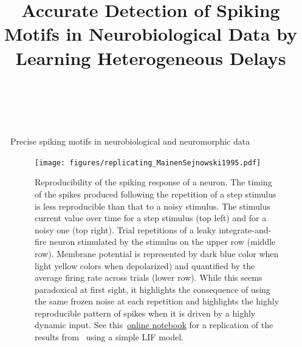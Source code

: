 \documentclass[final]{beamer}
\title{Accurate Detection of Spiking Motifs in Neurobiological Data by Learning Heterogeneous Delays
}
\author{\FirstLP\  \LastLP}
\institute[shortinst]{\inst{1} Some Institute \samelineand \inst{2} Another Institute}
\newlength{\sepwidth}
\newlength{\colwidth}
\newcommand{\separatorcolumn}{\begin{column}{\sepwidth}\end{column}}
\begin{document}
\begin{frame}[t]
\begin{columns}[t]
\separatorcolumn

\begin{column}{\colwidth}

  \begin{block}{Precise spiking motifs in neurobiological and neuromorphic data~\parencite{Grimaldi22polychronies}}


\begin{figure}[H]
\texttt{[image: figures/replicating\_MainenSejnowski1995.pdf]} 
\caption{
  Reproducibility of the spiking response of a neuron. 
The timing of the spikes produced following the repetition of a step stimulus is less reproducible than that to a noisy stimulus. The stimulus current value over time for a step stimulus (top left) and for a noisy one (top right). Trial repetitions of a leaky integrate-and-fire neuron stimulated by the stimulus on the upper row (middle row). Membrane potential is represented by dark blue color when light yellow colors when depolarized) and quantified by the average firing rate across trials (lower row). While this seems paradoxical at first sight, it highlights the consequence of using the same frozen noise at each repetition and highlights the highly reproducible pattern of spikes when it is driven by a highly dynamic input. See this~\href{https://github.com/laurentperrinet/2022_UE-neurosciences-computationnelles/blob/master/C_MainenSejnowski1995_Perrinet.ipynb}{online notebook}  for a replication of the results from~\parencite{mainen_reliability_1995} using a simple LIF model.}\label{fig:mainen}
\end{figure}
    



\end{block}
\end{column}
\end{columns}
\end{frame}
\end{document}
